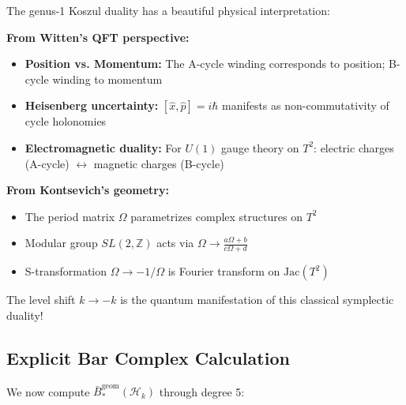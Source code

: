 \begin{remark}\label{rem:heisenberg-physics}
The genus-1 Koszul duality has a beautiful physical interpretation:

\textbf{From Witten's QFT perspective:}
\begin{itemize}
\item \textbf{Position vs. Momentum:} The A-cycle winding corresponds to position; B-cycle winding to momentum
\item \textbf{Heisenberg uncertainty:} $[\hat{x}, \hat{p}] = i\hbar$ manifests as non-commutativity of cycle holonomies
\item \textbf{Electromagnetic duality:} For $U(1)$ gauge theory on $T^2$: electric charges (A-cycle) $\leftrightarrow$ magnetic charges (B-cycle)
\end{itemize}

\textbf{From Kontsevich's geometry:}
\begin{itemize}
\item The period matrix $\Omega$ parametrizes complex structures on $T^2$
\item Modular group $SL(2,\mathbb{Z})$ acts via $\Omega \to \frac{a\Omega+b}{c\Omega+d}$
\item S-transformation $\Omega \to -1/\Omega$ is Fourier transform on $\text{Jac}(T^2)$
\end{itemize}

The level shift $k \to -k$ is the quantum manifestation of this classical symplectic duality!
\end{remark}

\subsection{Explicit Bar Complex Calculation}

We now compute $\bar{B}^{\text{geom}}_*(\mathcal{H}_k)$ through degree 5:

